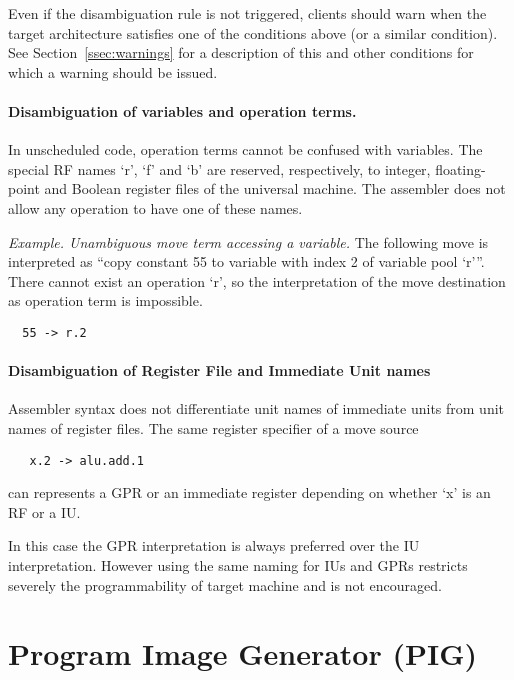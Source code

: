 \documentclass[twoside]{tceusermanual}
\begin{document}
Even if the disambiguation rule is not triggered, clients should warn when
the target architecture satisfies one of the conditions above (or a
similar condition).  See Section~\ref{ssec:warnings} for a description of
this and other conditions for which a warning should be issued.

\paragraph{Disambiguation of variables and operation terms.}
In unscheduled code, operation terms cannot be confused with variables. 
The
special RF names `r', `f' and `b' are reserved, respectively, to integer,
floating-point and Boolean register files of the universal machine. The
assembler does not allow any operation to have one of these names.
%

\emph{Example. Unambiguous move term accessing a variable.} The following
move is interpreted as ``copy constant 55 to variable with index 2 of
variable pool `r'''. There cannot exist an operation `r', so the
interpretation of the move destination as operation term is impossible.
\begin{verbatim}
  55 -> r.2
\end{verbatim}

\paragraph{Disambiguation of Register File and Immediate Unit names}

Assembler syntax does not differentiate unit names of immediate units from
unit names of register files.  The same register specifier of a move source
\begin{verbatim}
   x.2 -> alu.add.1
\end{verbatim}
can represents a GPR or an immediate register depending on whether `x' is an
RF or a IU.

In this case the GPR interpretation is always preferred over the IU 
interpretation. However using the same naming for IUs and GPRs
restricts severely the programmability of target machine and is not
encouraged.




\section{Program Image Generator (PIG)}
\end{document}
